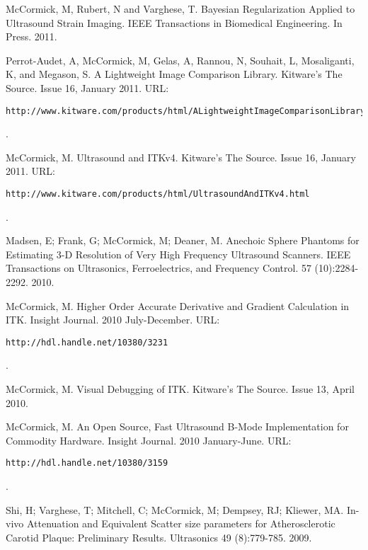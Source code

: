 \documentclass[margin,line]{res}
\begin{document}
\begin{resume}
McCormick, M, Rubert, N and Varghese, T.  Bayesian Regularization Applied to
Ultrasound Strain Imaging.  IEEE Transactions in Biomedical Engineering.
In Press.  2011.

Perrot-Audet, A, McCormick, M, Gelas, A, Rannou, N, Souhait, L, Mosaliganti, K,
and Megason, S.  A Lightweight Image Comparison Library.  Kitware's The Source.
Issue 16, January 2011.
\vspace*{-.25in}
URL: \begin{verbatim}http://www.kitware.com/products/html/ALightweightImageComparisonLibrary.html\end{verbatim}.
\vspace*{-.35in}

McCormick, M.  Ultrasound and ITKv4.  Kitware's The Source.  Issue 16, January
2011.
\vspace*{-.25in}
URL: \begin{verbatim}http://www.kitware.com/products/html/UltrasoundAndITKv4.html\end{verbatim}.
\vspace*{-.35in}

Madsen, E; Frank, G; McCormick, M; Deaner, M.  Anechoic Sphere Phantoms for
Estimating 3-D Resolution of Very High Frequency Ultrasound Scanners.
IEEE Transactions on Ultrasonics, Ferroelectrics, and Frequency Control. 57
(10):2284-2292. 2010.

McCormick, M.  Higher Order Accurate Derivative and Gradient Calculation in ITK.
Insight Journal.  2010 July-December.
\vspace*{-.25in}
URL: \begin{verbatim}http://hdl.handle.net/10380/3231\end{verbatim}.
\vspace*{-.35in}

McCormick, M.  Visual Debugging of ITK.  Kitware's The Source.  Issue 13, April
2010.

McCormick, M.  An Open Source, Fast Ultrasound B-Mode Implementation for
Commodity Hardware.  Insight Journal.  2010 January-June.
\vspace*{-.25in}
URL: \begin{verbatim}http://hdl.handle.net/10380/3159\end{verbatim}.
\vspace*{-.35in}

Shi, H; Varghese, T; Mitchell, C; McCormick, M; Dempsey, RJ; Kliewer, MA.
In-vivo Attenuation and Equivalent Scatter size parameters for Atherosclerotic
Carotid Plaque: Preliminary Results.  Ultrasonics 49 (8):779-785.  2009.


\end{resume}
\end{document}
